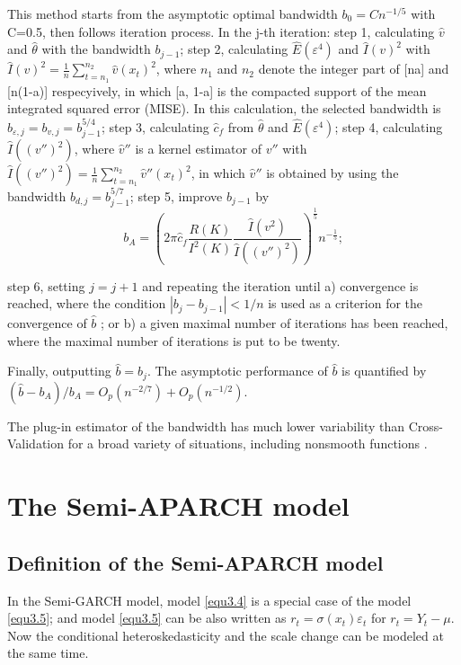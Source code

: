 This method starts from the asymptotic optimal bandwidth $b_{0}= Cn^{-1/5}$ with C=0.5, then follows iteration process. In the j-th iteration: step 1, calculating $\hat{v}$  and $\hat{\theta}$  with the bandwidth $b_{j-1}$; step 2, calculating $\hat{E}(\varepsilon^{4})$ and $\hat{I}(v)^{2}$  with   $\hat{I}(v)^{2} = \frac{1}{n}\sum_{t=n_{1}}^{n_{2}}\hat{v}(x_{t})^{2}$, where $n_{1}$  and $n_{2}$ denote the integer part of [na] and [n(1-a)] respecyively, in which [a, 1-a] is the compacted support of the mean integrated squared error (MISE). In this calculation, the selected bandwidth is $b_{\varepsilon,j}=b_{v,j}=b_{j-1}^{5/4}$; step 3, calculating $\hat{c}_{f}$  from $\hat{\theta}$  and $\hat{E}(\varepsilon^{4})$; step 4, calculating $\hat{I}((v'')^{2})$, where $\hat{v}''$  is a kernel estimator of   $v''$  with $\hat{I}((v'')^{2})= \frac{1}{n}\sum_{t=n_{1}}^{n_{2}}\hat{v}''(x_{t})^{2}$, in which $\hat{v}''$ is obtained by using the bandwidth $b_{d,j}=b_{j-1}^{5/7}$; step 5, improve $b_{j-1}$  by 
\[ b_{A} =(2\pi \hat{c}_{f} \frac{R(K)}{I^{2}(K)}\frac{\hat{I}(v^{2})}{\hat{I}((v'')^2)})^{\frac{1}{5}}n^{-\frac{1}{5}}; \]

step 6, setting $j=j+1$ and repeating the iteration until  a) convergence is reached, where the condition $|b_{j} - b_{j-1}| <1/n$  is used as a criterion for the convergence of $\hat{b}$ ; or b) a given maximal number of iterations has been reached, where the maximal number of iterations is put to be twenty. 

Finally, outputting $\hat{b} = b_{j}$. The asymptotic performance of $\hat{b}$ is quantified by $(\hat{b}-b_{A})/b_{A}=O_{p}(n^{-2/7})+O_{p}(n^{-1/2})$.

The plug-in estimator of the bandwidth has much lower variability than Cross- Validation for a broad variety of situations, including nonsmooth functions \citep{Gasser1991,Feng2004}.

\section{The Semi-APARCH model}
\subsection{Definition of the Semi-APARCH model}

In the Semi-GARCH model, model \ref{equ3.4} is a special case of the model \ref{equ3.5}; and model \ref{equ3.5} can be also written as $r_t= \sigma(x_t)\varepsilon_t$ for  $ r_{t}=Y_{t}-\mu$. Now the conditional heteroskedasticity and the scale change can be modeled at the same time.

